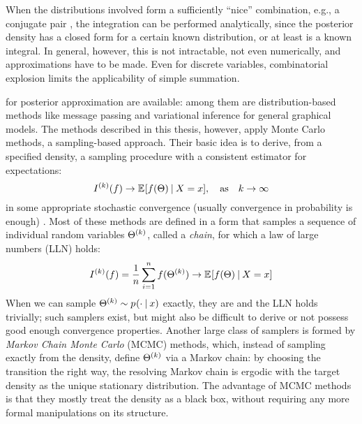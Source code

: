 When the distributions involved form a sufficiently \enquote{nice} combination, e.g., a conjugate
pair , the integration can be performed analytically, since the posterior density has a
closed form for a certain known distribution, or at least is a known integral.  In general, however,
this is not intractable, not even numerically, and approximations have to be made.  Even for
discrete variables, combinatorial explosion limits the applicability of simple summation.

 for posterior approximation are available: among them are
distribution-based methods like message passing and variational inference for general graphical
models.  The methods described in this thesis, however, apply Monte Carlo methods, a
sampling-based approach. Their basic idea is to derive, from a specified density, a sampling
procedure with a consistent estimator for expectations:
\begin{equation}
  \label{eq:mc-methods}
  \kth{I}(f) \to \Exp{f(\Theta) \given X = x}, \quad \text{as} \quad k
  \to \infty
\end{equation}
in some appropriate stochastic convergence (usually convergence in probability is enough)
\cite{vihola2020lectures}.  Most of these methods are defined in a form that samples a sequence of
individual random variables \(\Theta^{(k)}\), called a \emph{chain}, for which a law of large
numbers (LLN) holds:
\begin{equation}
  \label{eq:mc-lln}
  \kth{I}(f) = \frac{1}{n} \sum_{i=1}^{n} f(\kth{\Theta}) \to \Exp{f(\Theta) \given X = x}
\end{equation}
When we can sample \(\kth{\Theta} \sim \prob{\cdot \given x}\) exactly, they are \iid{} and the
LLN holds trivially; such samplers exist, but might also be difficult to derive or not possess good
enough convergence properties.  Another large class of samplers is formed by \emph{Markov Chain
  Monte Carlo} (MCMC) methods, which, instead of sampling exactly from the density, define
\(\Theta^{(k)}\) via a Markov chain: by choosing the transition the right way, the resolving
Markov chain is ergodic with the target density as the unique stationary distribution.  The
advantage of MCMC methods is that they mostly treat the density as a black box, without requiring
any more formal manipulations on its structure.

